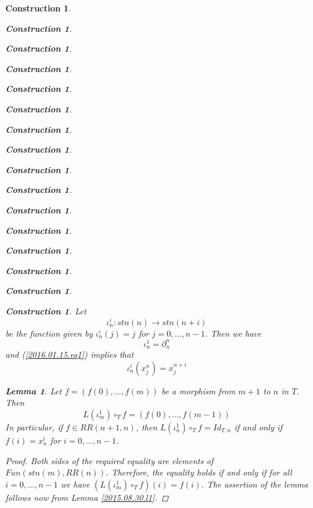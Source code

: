\documentclass[12pt]{amsart}
\newenvironment{eq}{\begin{equation}}{\end{equation}}
\newtheorem{lemma}[proposition]{Lemma}
\newtheorem{construction}[proposition]{Construction}
\newcommand{\llabel}[1]{\label{#1}}
\newcommand{\sr}{\rightarrow}
\newcommand{\hc}{\circ_{T}}
\begin{document}
\begin{construction}
\begin{construction}
\begin{construction}
\begin{construction}
\begin{construction}
\begin{construction}
\begin{construction}
\begin{construction}
\begin{construction}
\begin{construction}
\begin{construction}
\begin{construction}
\begin{construction}
\begin{construction}
\begin{construction}
\begin{construction}
Let 
%
$${\iota}_n^{i}:stn(n)\sr stn(n+i)$$
%
be the function given by ${\iota}_n^i(j)=j$ for $j=0,\dots,n-1$. Then we have
%
\begin{eq}
\llabel{2015.08.22.eq7}
{\iota}_n^{1}=\partial_{n}^{n}
\end{eq}%
%
and (\ref{2016.01.15.eq1}) implies that 
%
\begin{eq}
\llabel{2015.08.22.eq8}
{\iota}_n^i(x^n_j)=x^{n+i}_j
\end{eq}%
%
\begin{lemma}
\llabel{2015.08.26.l1}
Let $f=(f(0),\dots,f(m))$ be a morphism from $m+1$ to $n$ in $T$. Then
%
\begin{eq}\llabel{2016.01.15.eq3}
L(\iota_m^1)\hc f=(f(0),\dots,f(m-1))
\end{eq}%
%
In particular, if $f\in RR(n+1,n)$, then $L(\iota_n^1)\hc f=Id_{T,n}$ if and only if $f(i)=x_n^i$ for $i=0,\dots,n-1$. 
\end{lemma}
%
\begin{proof}
Both sides of the required equality are elements of
$Fun(stn(m),RR(n))$. Therefore, the equality holds if and only if for all
$i=0,\dots,n-1$ we have $(L(\iota_m^1)\hc f)(i)=f(i)$. The assertion of the
lemma follows now from Lemma \ref{2015.08.30.l1}.


\end{proof}
\end{construction}
\end{construction}
\end{construction}
\end{construction}
\end{construction}
\end{construction}
\end{construction}
\end{construction}
\end{construction}
\end{construction}
\end{construction}
\end{construction}
\end{construction}
\end{construction}
\end{construction}
\end{construction}
\end{document}
